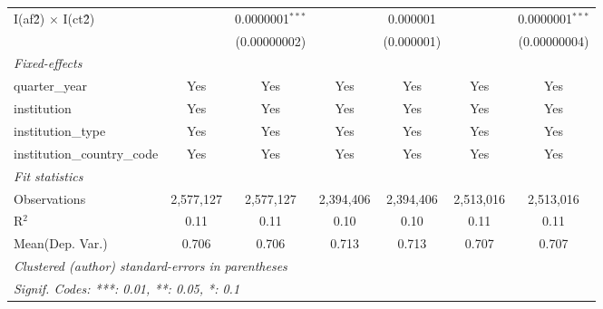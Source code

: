\begin{tabular}{lcccccc}
   I(af\^2) $\times$ I(ct\^2)         &               & 0.0000001$^{***}$ &               & 0.000001        &               & 0.0000001$^{***}$\\   
                                      &               & (0.00000002)      &               & (0.000001)      &               & (0.00000004)\\   
   \midrule
   \emph{Fixed-effects}\\
   quarter\_year                      & Yes           & Yes               & Yes           & Yes             & Yes           & Yes\\  
   institution                        & Yes           & Yes               & Yes           & Yes             & Yes           & Yes\\  
   institution\_type                  & Yes           & Yes               & Yes           & Yes             & Yes           & Yes\\  
   institution\_country\_code         & Yes           & Yes               & Yes           & Yes             & Yes           & Yes\\  
   \midrule
   \emph{Fit statistics}\\
   Observations                       & 2,577,127     & 2,577,127         & 2,394,406     & 2,394,406       & 2,513,016     & 2,513,016\\  
   R$^2$                              & 0.11          & 0.11              & 0.10          & 0.10            & 0.11          & 0.11\\  
Mean(Dep. Var.) & 0.706 & 0.706 & 0.713 & 0.713 & 0.707 & 0.707 \\
   \midrule \midrule
   \multicolumn{7}{l}{\emph{Clustered (author) standard-errors in parentheses}}\\
   \multicolumn{7}{l}{\emph{Signif. Codes: ***: 0.01, **: 0.05, *: 0.1}}\\
\end{tabular}
\par\endgroup
